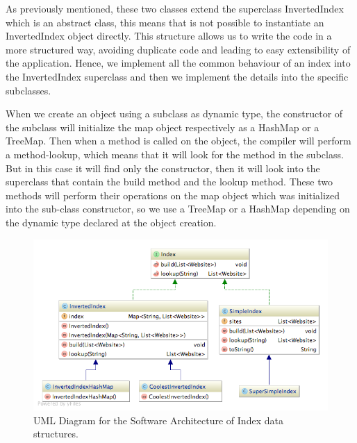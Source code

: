 As previously mentioned, these two classes extend the superclass InvertedIndex which is an abstract class, this means that is not possible to instantiate an InvertedIndex object directly. This structure allows us to write the code in a more structured way, avoiding duplicate code and leading to easy extensibility of the application. Hence, we implement all the common behaviour of an index into the InvertedIndex superclass and then we implement the details into the specific subclasses.

When we create an object using a subclass as dynamic type, the constructor of the subclass will initialize the map object respectively as a HashMap or a TreeMap. Then when a method is called on the object, the compiler will perform a method-lookup, which means that it will look for the method in the subclass. But in this case it will find only the constructor, then it will look into the superclass that contain the build method and the lookup method. These two methods will perform their operations on the map object which was initialized into the sub-class constructor, so we use a TreeMap or a HashMap depending on the dynamic type declared at the object creation.


\begin{figure}[t]
	\centering
	\includegraphics[width=\textwidth]{graphics/diagram-index.png}
	\caption{UML Diagram for the Software Architecture of Index data structures.}
	\label{fig:index:uml}
\end{figure}



